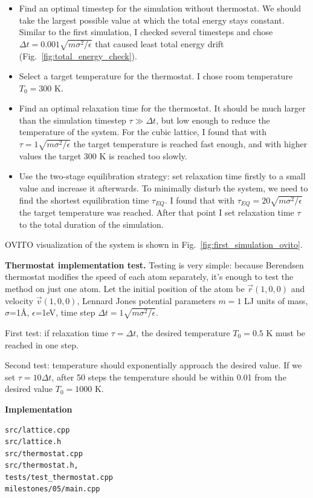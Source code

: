 \documentclass[12pt,a4paper]{article}
\newcommand{\mat}[1]{\vec{#1}}
\begin{document}
\begin{itemize}
	\item Find an optimal timestep for the simulation without thermostat. We should take the largest possible value at which the total energy stays constant. Similar to the first simulation, I checked several timesteps and chose $\Delta t = 0.001 \sqrt{m\sigma^2 / \epsilon}$ that caused least total energy drift (Fig.~\ref{fig:total_energy_check}).
	\item Select a target temperature for the thermostat. I chose room temperature $T_0 = 300$ K.
	\item Find an optimal relaxation time for the thermostat. It should be much larger than the simulation timestep $\tau \gg \Delta t$, but low enough to reduce the temperature of the system. For the cubic lattice, I found that with $\tau = 1 \sqrt{m\sigma^2 / \epsilon}$ the target temperature is reached fast enough, and with higher values the target 300 K is reached too slowly.
	\item Use the two-stage equilibration strategy: set relaxation time firstly to a small value and increase it afterwards. To minimally disturb the system, we need to find the shortest equilibration time $\tau_{EQ}$. I found that with $\tau_{EQ} = 20 \sqrt{m\sigma^2 / \epsilon}$ the target temperature was reached. After that point I set relaxation time $\tau$ to the total duration of the simulation.
\end{itemize}

OVITO visualization of the system is shown in Fig.~\ref{fig:first_simulation_ovito}.

{\bf Thermostat implementation test.} Testing is very simple: because Berendsen thermostat modifies the speed of each atom separately, it's enough to test the method on just one atom. Let the initial position of the atom be $\mat{r}(1, 0, 0)$ and velocity $\mat{v}(1, 0, 0)$, Lennard Jones potential parameters $m=1$ LJ units of mass, $\sigma$=1Å, $\epsilon$=1eV, time step $\Delta t=1 \sqrt{m\sigma^2 / \epsilon}$.

First test: if relaxation time $\tau = \Delta t$, the desired temperature $T_0 = 0.5$ K must be reached in one step.

Second test: temperature should exponentially approach the desired value. If we set $\tau = 10 \Delta t$, after 50 steps the temperature should be within 0.01 from the desired value $T_0 = 1000$ K.


{\bf Implementation}
\begin{lstlisting}[breaklines]
src/lattice.cpp
src/lattice.h
src/thermostat.cpp
src/thermostat.h,
tests/test_thermostat.cpp
milestones/05/main.cpp
\end{lstlisting}
\end{document}
